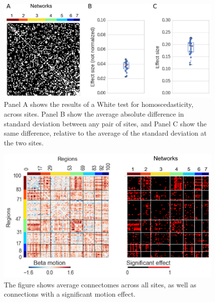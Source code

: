 \documentclass[authoryear]{elsarticle}
\begin{document}
\begin{figure}[htbp]
\begin{center}
\includegraphics[width=\linewidth]{../figures/hetero.png}
\end{center}
\caption[]{
Panel A shows the results of a White test for homoscedasticity, across sites. Panel B show the average absolute difference in standard deviation between any pair of sites, and Panel C show the same difference, relative to the average of the standard deviation at the two sites. 
}
\label{fig_hetero}
\end{figure}

\begin{figure}[htbp]
\begin{center}
\includegraphics[width=\linewidth]{../figures/effect_motion.png}
\end{center}
\caption[Connectome variability across sites]{
The figure shows average connectomes across all sites, as well as connections with a significant motion effect.
}
\label{fig_connectome_variability_motion}
\end{figure}
\end{document}
